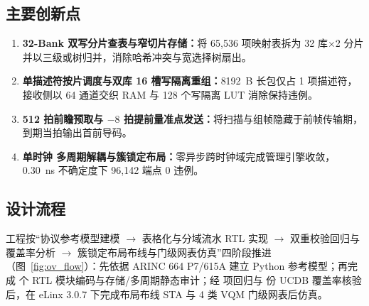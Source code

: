 \subsection{主要创新点}

\begin{enumerate}[label=（\arabic*）,leftmargin=2.2em,itemsep=1pt]
  \item \textbf{32-Bank 双写分片查表与窄切片存储：}将 65,536 项映射表拆为 32 库$\times$2 分片并以三级或树归并，消除哈希冲突与宽选择树扇出。
  \item \textbf{单描述符按片调度与双库 16 槽写隔离重组：}8192~B 长包仅占 1 项描述符，接收侧以 64 通道交织 RAM 与 128 个写隔离 LUT 消除保持违例。
  \item \textbf{512 拍前瞻预取与 $-8$ 拍提前量准点发送：}将扫描与组帧隐藏于前帧传输期，到期当拍输出首前导码。
  \item \textbf{单时钟  多周期解耦与簇锁定布局：}零异步跨时钟域完成管理引擎收敛，0.30~ns 不确定度下 96,142 端点 0 违例。
\end{enumerate}

\subsection{设计流程}

工程按“协议参考模型建模 $\rightarrow$ 表格化与分域流水 RTL 实现 $\rightarrow$ 双重校验回归与覆盖率分析 $\rightarrow$ 簇锁定布局布线与门级网表仿真”四阶段推进（图~\ref{fig:ov_flow}）：先依据 ARINC 664 P7/615A 建立 Python 参考模型；再完成 \RtlFileCount{} 个 RTL 模块编码与存储/多周期静态审计；经 \RegCount{} 项回归与 \CovUcdbCount{} 份 UCDB 覆盖率核验后，在 eLinx 3.0.7 下完成布局布线 STA 与 4 类 VQM 门级网表后仿真。

